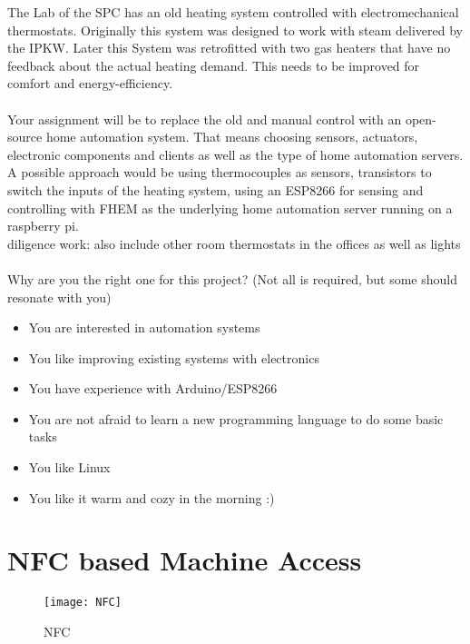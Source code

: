 The Lab of the \ac{SPC} has an old heating system controlled with electromechanical thermostats. 
Originally this system was designed to work with steam delivered by the \ac{IPKW}. 
Later this System was retrofitted with two gas heaters that have no feedback about the actual heating demand. This needs to be improved for comfort and energy-efficiency.\\
\\
Your assignment will be to replace the old and manual control with an open-source home automation system. That means choosing sensors, actuators, electronic components and clients as well as the type of home automation servers. 
A possible approach would be using thermocouples as sensors, transistors to switch the inputs of the heating system, using an ESP8266 for sensing and controlling with \ac{FHEM} as the underlying home automation server running on a raspberry pi.\\
diligence work: also include other room thermostats in the offices as well as lights\\
\\
Why are you the right one for this project? (Not all is required, but some should resonate with you)
\begin{itemize}
\item You are interested in automation systems
\item You like improving existing systems with electronics
\item You have experience with Arduino/ESP8266
\item You are not afraid to learn a new programming language to do some basic tasks
\item You like Linux
\item You like it warm and cozy in the morning :)
\end{itemize}
\bigskip
%
\section*{NFC based Machine Access}

	\begin{figure}[H]
	\centering
	\texttt{[image: NFC]}
	\caption{\ac{NFC} \cite{NFC}}
	\label{fig: NFC}
\end{figure}



